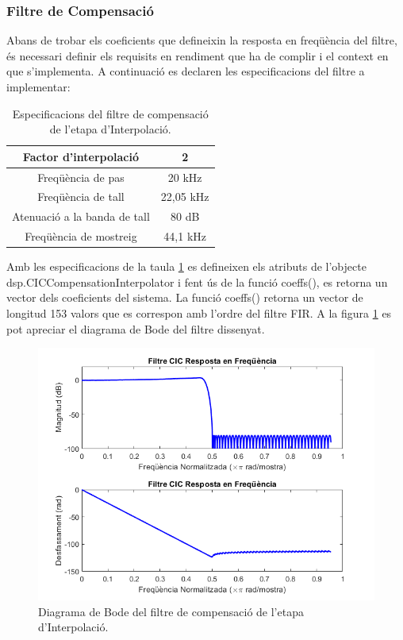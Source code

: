 \subsubsection{Filtre de Compensació}
\par Abans de trobar els coeficients que defineixin la resposta en freqüència del filtre, és necessari definir els requisits en rendiment que ha de complir i el context en que s'implementa. A continuació es declaren les especificacions del filtre a implementar:
\begin{table}[H]
    \centering
    \begin{tabular}{ | c | c | }
    \hline
    \centering
     Factor d'interpolació        &  2\\ \hline
     \centering
     Freqüència de pas            &  20 kHz\\ \hline
     \centering
     Freqüència de tall           &  22,05 kHz \\ \hline
     \centering
     Atenuació a la banda de tall &   80 dB\\ \hline
     \centering
     Freqüència de mostreig       &  44,1 kHz \\ \hline
    \end{tabular}
    \caption{Especificacions del filtre de compensació de l'etapa d'Interpolació.}
    \label{taula_filtre_compCIC}
\end{table}
\par Amb les especificacions de la taula \ref{taula_filtre_compCIC} es defineixen els atributs de l'objecte dsp.CICCompensationInterpolator i fent ús de la funció coeffs(), es retorna un vector dels coeficients del sistema. La funció coeffs() retorna un vector de longitud 153 valors que es correspon amb l'ordre del filtre FIR. A la figura \ref{Bode_CompCIC} es pot apreciar el diagrama de Bode del filtre dissenyat.
\begin{figure}[H]
    \centering
    \includegraphics[width=0.5\linewidth]{Images/CIC_CompensationFilter.png}
    \caption{Diagrama de Bode del filtre de compensació de l'etapa d'Interpolació.}
    \label{Bode_CompCIC}
\end{figure}
